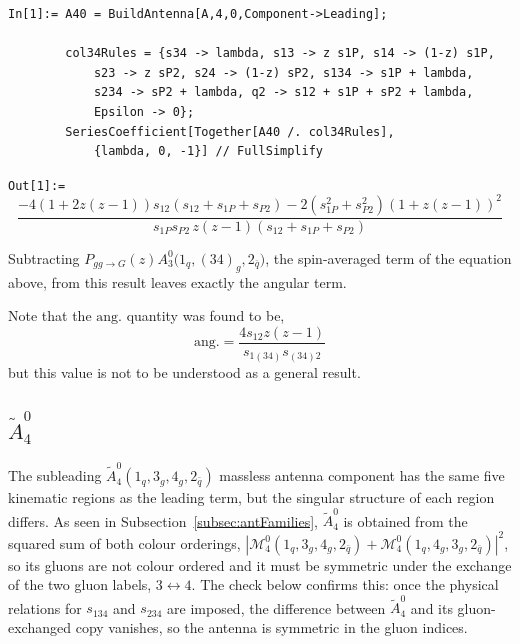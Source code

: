 \begin{mdframed}[backgroundcolor=gray!10, linewidth=0pt]
\begin{lstlisting}
In[1]:= A40 = BuildAntenna[A,4,0,Component->Leading];

        col34Rules = {s34 -> lambda, s13 -> z s1P, s14 -> (1-z) s1P,
            s23 -> z sP2, s24 -> (1-z) sP2, s134 -> s1P + lambda,
            s234 -> sP2 + lambda, q2 -> s12 + s1P + sP2 + lambda,
            Epsilon -> 0};
        SeriesCoefficient[Together[A40 /. col34Rules],
            {lambda, 0, -1}] // FullSimplify
\end{lstlisting}
\texttt{Out[1]:=}
    \begin{equation*}
        \frac{-4\left(1+2z(z-1)\right)s_{12}\left(s_{12}+s_{1P}+s_{P2}\right)-2\left(s_{1P}^2+s_{P2}^2\right)\left(1+z(z-1)\right)^2}{s_{1P}s_{P2}\,z(z-1)\left(s_{12}+s_{1P}+s_{P2}\right)}
    \end{equation*}
\end{mdframed}
Subtracting $P_{gg\to G}(z)A_3^0\big(1_q,(34)_g,2_{\bar q}\big)$, the spin-averaged term of the equation above, from this
result leaves exactly the angular term.

Note that the $\mathrm{ang.}$ quantity was found to be,
\begin{equation}
    \mathrm{ang.} = \frac{4s_{12}z(z-1)}{s_{1(34)}s_{(34)2}}
\end{equation}
but this value is not to be understood as a general result.

\subsection{$\tilde A_4^0$}\label{subsec:localValidationA40Tilde}

The subleading $\tilde A_4^0(1_q,3_g,4_g,2_{\bar q})$ massless antenna component has the same five
kinematic regions as the leading term, but the singular structure of each region differs. As seen in
Subsection~\ref{subsec:antFamilies}, $\tilde A_4^0$ is obtained from the squared sum of both colour
orderings, $\left|\mathcal M_4^0(1_q,3_g,4_g,2_{\bar q})+\mathcal M_4^0(1_q,4_g,3_g,2_{\bar q})\right|^2$, so its
gluons are not colour ordered and it must be symmetric under the exchange of the two gluon labels,
$3\leftrightarrow4$. The check below confirms this: once the physical relations for $s_{134}$ and
$s_{234}$ are imposed, the difference between $\tilde A_4^0$ and its gluon-exchanged copy vanishes, so
the antenna is symmetric in the gluon indices.

